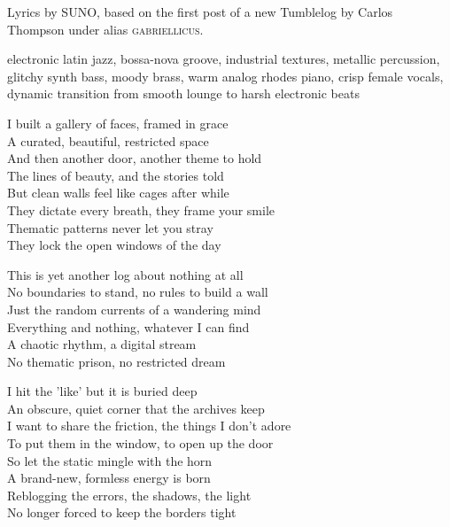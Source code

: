 
\begin{notes}
Lyrics by SUNO, based on the first post of a new Tumblelog by Carlos Thompson under alias \textsc{gabriellicus}.
\end{notes}
\begin{style}
electronic latin jazz, bossa-nova groove, industrial textures, metallic percussion, glitchy synth bass, moody brass, warm analog rhodes piano, crisp female vocals, dynamic transition from smooth lounge to harsh electronic beats
\end{style}
\begin{lyrics}

I built a gallery of faces, framed in grace\\
A curated, beautiful, restricted space\\
And then another door, another theme to hold\\
The lines of beauty, and the stories told\\
But clean walls feel like cages after while\\
They dictate every breath, they frame your smile\\
Thematic patterns never let you stray\\
They lock the open windows of the day

This is yet another log about nothing at all\\
No boundaries to stand, no rules to build a wall\\
Just the random currents of a wandering mind\\
Everything and nothing, whatever I can find\\
A chaotic rhythm, a digital stream\\
No thematic prison, no restricted dream

I hit the 'like' but it is buried deep\\
An obscure, quiet corner that the archives keep\\
I want to share the friction, the things I don't adore\\
To put them in the window, to open up the door\\
So let the static mingle with the horn\\
A brand-new, formless energy is born\\
Reblogging the errors, the shadows, the light\\
No longer forced to keep the borders tight


\end{lyrics}
